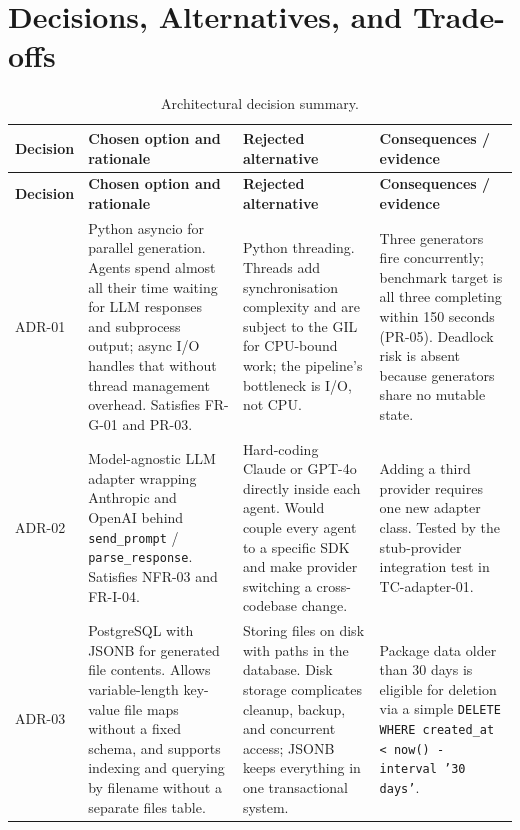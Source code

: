\section{Decisions, Alternatives, and Trade-offs}
\label{sec:decisions}

\begin{longtable}{@{}p{}p{}p{}p{}@{}}
\caption{Architectural decision summary.}\label{tab:decisions}\\
\toprule
\textbf{Decision} & \textbf{Chosen option and rationale} & \textbf{Rejected alternative} & \textbf{Consequences / evidence} \\
\midrule
\endfirsthead
\toprule
\textbf{Decision} & \textbf{Chosen option and rationale} & \textbf{Rejected alternative} & \textbf{Consequences / evidence} \\
\midrule
\endhead

ADR-01 &
  Python asyncio for parallel generation. Agents spend almost all their time
  waiting for LLM responses and subprocess output; async I/O handles that
  without thread management overhead. Satisfies FR-G-01 and PR-03. &
  Python threading. Threads add synchronisation complexity and are subject
  to the GIL for CPU-bound work; the pipeline's bottleneck is I/O, not CPU. &
  Three generators fire concurrently; benchmark target is all three completing
  within 150 seconds (PR-05). Deadlock risk is absent because generators share
  no mutable state. \\

ADR-02 &
  Model-agnostic LLM adapter wrapping Anthropic and OpenAI behind
  \texttt{send\_prompt} / \texttt{parse\_response}. Satisfies NFR-03 and
  FR-I-04. &
  Hard-coding Claude or GPT-4o directly inside each agent. Would couple every
  agent to a specific SDK and make provider switching a cross-codebase change. &
  Adding a third provider requires one new adapter class. Tested by the
  stub-provider integration test in TC-adapter-01. \\

ADR-03 &
  PostgreSQL with JSONB for generated file contents. Allows variable-length
  key-value file maps without a fixed schema, and supports indexing and
  querying by filename without a separate files table. &
  Storing files on disk with paths in the database. Disk storage complicates
  cleanup, backup, and concurrent access; JSONB keeps everything in one
  transactional system. &
  Package data older than 30 days is eligible for deletion via a simple
  \texttt{DELETE WHERE created\_at < now() - interval '30 days'}. \\


\end{longtable}
